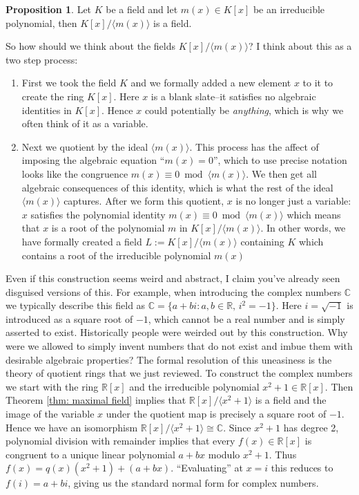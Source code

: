 \documentclass[11pt]{article}
\def\RR{\mathbb{R}}
\def\CC{\mathbb{C}}
\theoremstyle{definition}
\newtheorem{proposition}[theorem]{Proposition}
\numberwithin{equation}{subsection}
\begin{document}
\begin{proposition}
    Let $K$ be a field and let $m(x) \in K[x]$ be an irreducible polynomial, then $K[x]/\langle m(x)\rangle$ is a field.
\end{proposition}

So how should we think about the fields $K[x]/\langle m(x)\rangle$?
I think about this as a two step process:
\begin{enumerate}
    \item First we took the field $K$ and we formally added a new element $x$ to it to create the ring $K[x]$.
    Here $x$ is a blank slate--it satisfies no algebraic identities in $K[x]$.
    Hence $x$ could potentially be \emph{anything}, which is why we often think of it as a variable.

    \item Next we quotient by the ideal $\langle m(x)\rangle$.
    This process has the affect of imposing the algebraic equation ``$m(x) = 0$'', which to use precise notation looks like the congruence $m(x) \equiv 0 \bmod \langle m(x)\rangle$. 
    We then get all algebraic consequences of this identity, which is what the rest of the ideal $\langle m(x)\rangle$ captures.
    After we form this quotient, $x$ is no longer just a variable: $x$ satisfies the polynomial identity $m(x) \equiv 0 \bmod \langle m(x) \rangle$ which means that $x$ is a root of the polynomial $m$ in $K[x]/\langle m(x)\rangle$.
    In other words, we have formally created a field $L := K[x]/\langle m(x)\rangle$ containing $K$ which contains a root of the irreducible polynomial $m(x)$
\end{enumerate}

Even if this construction seems weird and abstract, I claim you've already seen disguised versions of this.
For example, when introducing the complex numbers $\CC$ we typically describe this field as $\CC = \{a + bi : a, b \in \RR,\,  i^2 = -1\}.$
Here $i = \sqrt{-1}$ is introduced as a square root of $-1$, which cannot be a real number and is simply asserted to exist.
Historically people were weirded out by this construction.
Why were we allowed to simply invent numbers that do not exist and imbue them with desirable algebraic properties?
The formal resolution of this uneasiness is the theory of quotient rings that we just reviewed.
To construct the complex numbers we start with the ring $\RR[x]$ and the irreducible polynomial $x^2 + 1 \in \RR[x]$.
Then Theorem \ref{thm: maximal field} implies that $\RR[x]/\langle x^2 + 1\rangle$ is a field and the image of the variable $x$ under the quotient map is precisely a square root of $-1$.
Hence we have an isomorphism $\RR[x]/\langle x^2 + 1\rangle \cong \CC$.
Since $x^2 + 1$ has degree 2, polynomial division with remainder implies that every $f(x) \in \RR[x]$ is congruent to a unique linear polynomial $a + bx$ modulo $x^2 + 1$.
Thus $f(x) = q(x)(x^2 + 1) + (a + bx)$.
``Evaluating'' at $x = i$ this reduces to $f(i) = a + bi$, giving us the standard normal form for complex numbers.
\end{document}
